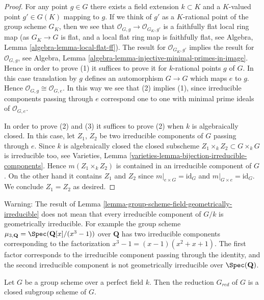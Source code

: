 \begin{proof}
For any point $g \in G$ there exists a field extension
$k \subset K$ and a $K$-valued point $g' \in G(K)$ mapping to
$g$. If we think of $g'$ as a $K$-rational point of the
group scheme $G_K$, then we see that
$\mathcal{O}_{G, g} \to \mathcal{O}_{G_K, g'}$ is a faithfully flat
local ring map (as $G_K \to G$ is flat, and a local flat ring map
is faithfully flat, see
Algebra, Lemma \ref{algebra-lemma-local-flat-ff}).
The result for $\mathcal{O}_{G_K, g'}$ implies the
result for $\mathcal{O}_{G, g}$, see
Algebra, Lemma \ref{algebra-lemma-injective-minimal-primes-in-image}.
Hence in order to prove (1) it suffices to
prove it for $k$-rational points $g$ of $G$. In this case
translation by $g$ defines an automorphism $G \to G$
which maps $e$ to $g$. Hence $\mathcal{O}_{G, g} \cong \mathcal{O}_{G, e}$.
In this way we see that (2) implies (1), since irreducible components
passing through $e$ correspond one to one with minimal prime ideals
of $\mathcal{O}_{G, e}$.

\medskip\noindent
In order to prove (2) and (3) it suffices to prove (2) when $k$
is algebraically closed. In this case, let $Z_1$, $Z_2$ be two
irreducible components of $G$ passing through $e$.
Since $k$ is algebraically closed the closed subscheme
$Z_1 \times_k Z_2 \subset G \times_k G$ is irreducible too, see
Varieties, Lemma \ref{varieties-lemma-bijection-irreducible-components}.
Hence $m(Z_1 \times_k Z_2)$ is contained in an irreducible
component of $G$. On the other hand it contains
$Z_1$ and $Z_2$ since $m|_{e \times G} = \text{id}_G$ and
$m|_{G \times e} = \text{id}_G$. We conclude $Z_1 = Z_2$ as desired.
\end{proof}

\begin{remark}
\label{remark-warning-group-scheme-geometrically-irreducible}
Warning: The result of
Lemma \ref{lemma-group-scheme-field-geometrically-irreducible}
does not mean that every irreducible component of $G/k$ is
geometrically irreducible. For example the group scheme
$\mu_{3, \mathbf{Q}} = \Spec(\mathbf{Q}[x]/(x^3 - 1))$
over $\mathbf{Q}$ has two irreducible components corresponding
to the factorization $x^3 - 1 = (x - 1)(x^2 + x + 1)$.
The first factor corresponds to the irreducible component
passing through the identity, and the second irreducible component
is not geometrically irreducible over $\Spec(\mathbf{Q})$.
\end{remark}

\begin{lemma}
\label{lemma-reduced-subgroup-scheme-perfect}
Let $G$ be a group scheme over a perfect field $k$.
Then the reduction $G_{red}$ of $G$ is a closed subgroup scheme of $G$.
\end{lemma}

